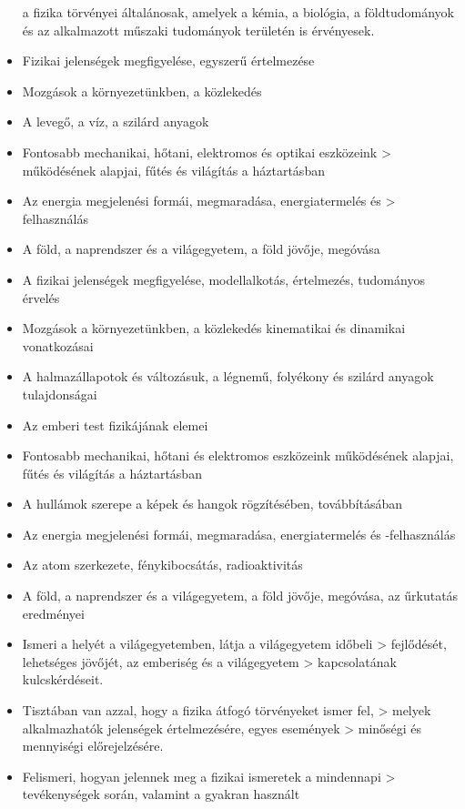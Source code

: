 \begin{itemize}
  a fizika törvényei általánosak, amelyek a kémia, a biológia, a
  földtudományok és az alkalmazott műszaki tudományok területén is
  érvényesek.
\item
  Fizikai jelenségek megfigyelése, egyszerű értelmezése
\item
  Mozgások a környezetünkben, a közlekedés
\item
  A levegő, a víz, a szilárd anyagok
\item
  Fontosabb mechanikai, hőtani, elektromos és optikai eszközeink
  \textgreater{} működésének alapjai, fűtés és világítás a háztartásban
\item
  Az energia megjelenési formái, megmaradása, energiatermelés és
  \textgreater{} felhasználás
\item
  A föld, a naprendszer és a világegyetem, a föld jövője, megóvása
\item
  A fizikai jelenségek megfigyelése, modellalkotás, értelmezés,
  tudományos érvelés
\item
  Mozgások a környezetünkben, a közlekedés kinematikai és dinamikai
  vonatkozásai
\item
  A halmazállapotok és változásuk, a légnemű, folyékony és szilárd
  anyagok tulajdonságai
\item
  Az emberi test fizikájának elemei
\item
  Fontosabb mechanikai, hőtani és elektromos eszközeink működésének
  alapjai, fűtés és világítás a háztartásban
\item
  A hullámok szerepe a képek és hangok rögzítésében, továbbításában
\item
  Az energia megjelenési formái, megmaradása, energiatermelés és
  -felhasználás
\item
  Az atom szerkezete, fénykibocsátás, radioaktivitás
\item
  A föld, a naprendszer és a világegyetem, a föld jövője, megóvása, az
  űrkutatás eredményei
\item
  Ismeri a helyét a világegyetemben, látja a világegyetem időbeli
  \textgreater{} fejlődését, lehetséges jövőjét, az emberiség és a
  világegyetem \textgreater{} kapcsolatának kulcskérdéseit.
\item
  Tisztában van azzal, hogy a fizika átfogó törvényeket ismer fel,
  \textgreater{} melyek alkalmazhatók jelenségek értelmezésére, egyes
  események \textgreater{} minőségi és mennyiségi előrejelzésére.
\item
  Felismeri, hogyan jelennek meg a fizikai ismeretek a mindennapi
  \textgreater{} tevékenységek során, valamint a gyakran használt

\end{itemize}

